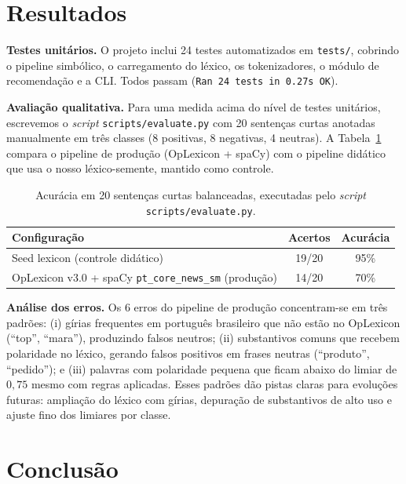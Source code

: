 \documentclass[11pt,a4paper]{article}
\newenvironment{newblock}{\par\color{newblue}}{\par\color{black}}
\begin{document}
\begin{newblock}
\section{Resultados}

\textbf{Testes unitários.} O projeto inclui 24 testes automatizados em \texttt{tests/}, cobrindo o pipeline simbólico, o carregamento do léxico, os tokenizadores, o módulo de recomendação e a CLI. Todos passam (\texttt{Ran 24 tests in 0.27s OK}).

\textbf{Avaliação qualitativa.} Para uma medida acima do nível de testes unitários, escrevemos o \emph{script} \texttt{scripts/evaluate.py} com 20 sentenças curtas anotadas manualmente em três classes (8 positivas, 8 negativas, 4 neutras). A Tabela~\ref{tab:acuracia} compara o pipeline de produção (OpLexicon + spaCy) com o pipeline didático que usa o nosso léxico-semente, mantido como controle.

\begin{table}[h]
\small
\centering
\begin{tabular}{@{}lcc@{}}
\toprule
\textbf{Configuração} & \textbf{Acertos} & \textbf{Acurácia} \\
\midrule
Seed lexicon (controle didático) & 19/20 & 95\% \\
OpLexicon v3.0 + spaCy \texttt{pt\_core\_news\_sm} (produção) & 14/20 & 70\% \\
\bottomrule
\end{tabular}
\caption{Acurácia em 20 sentenças curtas balanceadas, executadas pelo \emph{script} \texttt{scripts/evaluate.py}.}
\label{tab:acuracia}
\end{table}

\textbf{Análise dos erros.} Os 6 erros do pipeline de produção concentram-se em três padrões: (i) gírias frequentes em português brasileiro que não estão no OpLexicon (``top'', ``mara''), produzindo falsos neutros; (ii) substantivos comuns que recebem polaridade no léxico, gerando falsos positivos em frases neutras (``produto'', ``pedido''); e (iii) palavras com polaridade pequena que ficam abaixo do limiar de $0{,}75$ mesmo com regras aplicadas. Esses padrões dão pistas claras para evoluções futuras: ampliação do léxico com gírias, depuração de substantivos de alto uso e ajuste fino dos limiares por classe.
\end{newblock}

\section{Conclusão}
\label{sec:conclusao}
\end{document}
